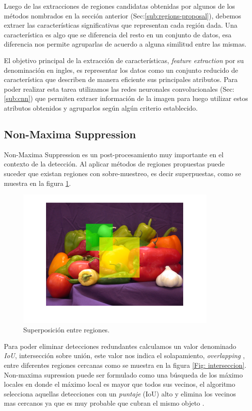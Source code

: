 Luego de las extracciones de regiones candidatas obtenidas por algunos de los métodos nombrados en la sección anterior (Sec:\ref{sub:regions-proposal}), debemos extraer las características significativas que representan cada región dada. Una  característica es algo que se diferencia del resto en un conjunto de datos, esa diferencia nos permite agruparlas de acuerdo a alguna
similitud entre las mismas. 

El objetivo principal de la  extracción de características, \textit{feature extraction} por su denominación en ingles, es representar los datos como un conjunto reducido de característica que describen de manera eficiente sus principales atributos. Para poder realizar esta tarea utilizamos  las redes neuronales convolucionales (Sec:\ref{sub:cnn}) que  permiten extraer información de la imagen para luego utilizar estos atributos obtenidos y agruparlos según algún criterio establecido. 


\subsection{Non-Maxima Suppression}\label{sub:nonmaximumsuppression}

Non-Maxima Suppression es un post-procesamiento muy importante en el contexto de la detección. Al aplicar métodos de regiones propuestas puede suceder que existan regiones con sobre-muestreo, es decir superpuestas, como se muestra en la figura  \ref{Fig: overlapping}. 

\begin{figure}[H]
 \centering
  \includegraphics[height=7cm,keepaspectratio=true,clip=true]{imagenes/MarcoTeorico/overlapMat.png}
  \caption{Superposición entre regiones.} \label{Fig: overlapping}
\end{figure}

Para poder eliminar detecciones redundantes calculamos un valor denominado  \textit{IoU}, intersección sobre unión,  este valor nos indica el solapamiento, \textit{overlapping} ,  entre diferentes regiones cercanas como se muestra en la figura \ref{Fig: interseccion}. Non-maxima supression puede ser formulado como una búsqueda de los máximo locales en donde el máximo local es  mayor que todos sus vecinos,  el algoritmo selecciona aquellas detecciones con un \textit{puntaje} (IoU) alto y elimina los vecinos mas cercanos ya que es muy probable que cubran el mismo objeto \citep{nms2}.

